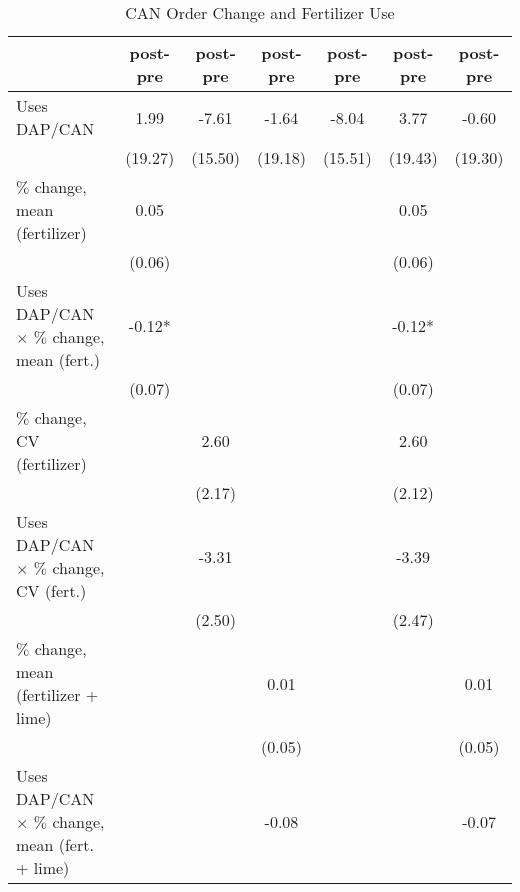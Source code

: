 \begin{table}[htbp]
\centering
\hspace*{-1.2cm}
\begin{threeparttable}
\small
\caption{CAN Order Change and Fertilizer Use}
\label{tab:A2can_int}
\begin{tabular}{l cccccc}
\hline
\hline
                    &\multicolumn{1}{c}{post-pre}&\multicolumn{1}{c}{post-pre}&\multicolumn{1}{c}{post-pre}&\multicolumn{1}{c}{post-pre}&\multicolumn{1}{c}{post-pre}&\multicolumn{1}{c}{post-pre}\\
\hline
Uses DAP/CAN        &        1.99   &       -7.61   &       -1.64   &       -8.04   &        3.77   &       -0.60   \\
                    &     (19.27)   &     (15.50)   &     (19.18)   &     (15.51)   &     (19.43)   &     (19.30)   \\
$\%$ change, mean (fertilizer)&        0.05   &               &               &               &        0.05   &               \\
                    &      (0.06)   &               &               &               &      (0.06)   &               \\
Uses DAP/CAN $\times$ $\%$ change, mean (fert.)&       -0.12*  &               &               &               &       -0.12*  &               \\
                    &      (0.07)   &               &               &               &      (0.07)   &               \\
$\%$ change, CV (fertilizer)&               &        2.60   &               &               &        2.60   &               \\
                    &               &      (2.17)   &               &               &      (2.12)   &               \\
Uses DAP/CAN $\times$ $\%$ change, CV (fert.)&               &       -3.31   &               &               &       -3.39   &               \\
                    &               &      (2.50)   &               &               &      (2.47)   &               \\
$\%$ change, mean (fertilizer + lime)&               &               &        0.01   &               &               &        0.01   \\
                    &               &               &      (0.05)   &               &               &      (0.05)   \\
Uses DAP/CAN $\times$ $\%$ change, mean (fert. + lime)&               &               &       -0.08   &               &               &       -0.07   \\

\end{tabular}
\end{threeparttable}
\end{table}

